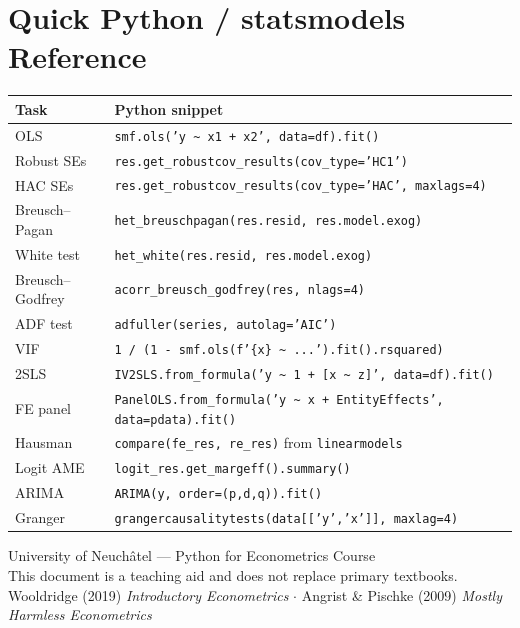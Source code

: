 \documentclass[10pt,a4paper]{article}
\begin{document}
\vspace{1em}

\section{Quick Python / statsmodels Reference}

\small
\begin{tabularx}{\linewidth}{lX}
\toprule
\rowcolor{NavyBlue}
\color{white}\textbf{Task} & \color{white}\textbf{Python snippet} \\
\midrule
OLS & \texttt{smf.ols('y \textasciitilde{} x1 + x2', data=df).fit()} \\
\rowcolor{RowGray}
Robust SEs & \texttt{res.get\_robustcov\_results(cov\_type='HC1')} \\
HAC SEs & \texttt{res.get\_robustcov\_results(cov\_type='HAC', maxlags=4)} \\
\rowcolor{RowGray}
Breusch--Pagan & \texttt{het\_breuschpagan(res.resid, res.model.exog)} \\
White test & \texttt{het\_white(res.resid, res.model.exog)} \\
\rowcolor{RowGray}
Breusch--Godfrey & \texttt{acorr\_breusch\_godfrey(res, nlags=4)} \\
ADF test & \texttt{adfuller(series, autolag='AIC')} \\
\rowcolor{RowGray}
VIF & \texttt{1 / (1 - smf.ols(f'\{x\} \textasciitilde{} ...').fit().rsquared)} \\
2SLS & \texttt{IV2SLS.from\_formula('y \textasciitilde{} 1 + [x \textasciitilde{} z]', data=df).fit()} \\
\rowcolor{RowGray}
FE panel & \texttt{PanelOLS.from\_formula('y \textasciitilde{} x + EntityEffects', data=pdata).fit()} \\
Hausman & \texttt{compare(fe\_res, re\_res)} from \texttt{linearmodels} \\
\rowcolor{RowGray}
Logit AME & \texttt{logit\_res.get\_margeff().summary()} \\
ARIMA & \texttt{ARIMA(y, order=(p,d,q)).fit()} \\
\rowcolor{RowGray}
Granger & \texttt{grangercausalitytests(data[['y','x']], maxlag=4)} \\
\bottomrule
\end{tabularx}

\normalsize

\vfill
\begin{center}
\small\color{gray}
University of Neuch\^{a}tel --- Python for Econometrics Course\\
This document is a teaching aid and does not replace primary textbooks.\\
Wooldridge (2019) \textit{Introductory Econometrics} $\cdot$
Angrist \& Pischke (2009) \textit{Mostly Harmless Econometrics}
\end{center}
\end{document}
